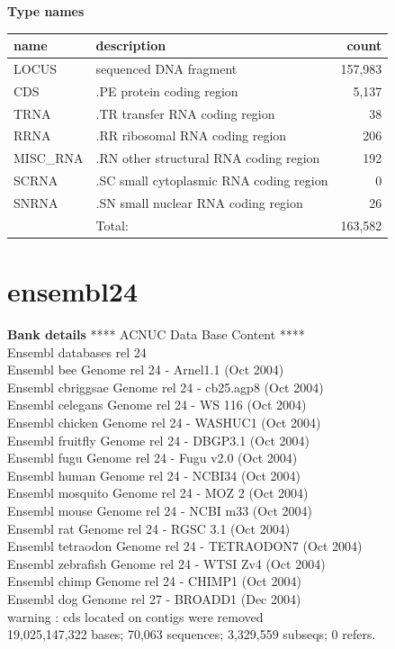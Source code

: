 \documentclass{article}
\begin{document}
\begin{Schunk}
\textbf{Type names}
\noindent\begin{tabular}{llr}
\hline \hline
name & description & count \\
\hline
LOCUS  &  sequenced DNA fragment  &  157,983 \\
CDS  &  .PE protein coding region  &  5,137 \\
TRNA  &  .TR transfer RNA coding region  &  38 \\
RRNA  &  .RR ribosomal RNA coding region  &  206 \\
MISC\_RNA  &  .RN other structural RNA coding region  &  192 \\
SCRNA  &  .SC small cytoplasmic RNA coding region  &  0 \\
SNRNA  &  .SN small nuclear RNA coding region  &  26 \\
\hline
 & Total: & 163,582 \\
\hline \hline
\end{tabular}

\section{ ensembl24 }
\textbf{Bank details}
            ****     ACNUC Data Base Content      ****  \\
	     Ensembl databases rel 24\\
             Ensembl bee  Genome rel 24 - Arnel1.1 (Oct 2004)\\
             Ensembl cbriggsae  Genome rel 24 - cb25.agp8 (Oct 2004)\\
             Ensembl celegans  Genome rel 24 - WS 116 (Oct 2004)\\
             Ensembl chicken  Genome rel 24 - WASHUC1 (Oct 2004)\\
             Ensembl fruitfly  Genome rel 24 - DBGP3.1 (Oct 2004)\\
             Ensembl fugu  Genome rel 24 - Fugu v2.0 (Oct 2004)\\
             Ensembl human  Genome rel 24 - NCBI34 (Oct 2004)\\
             Ensembl mosquito  Genome rel 24 - MOZ 2 (Oct 2004)\\
             Ensembl mouse  Genome rel 24 - NCBI m33 (Oct 2004)\\
             Ensembl rat  Genome rel 24 - RGSC 3.1 (Oct 2004)\\
             Ensembl tetraodon  Genome rel 24 - TETRAODON7 (Oct 2004)\\
             Ensembl zebrafish  Genome rel 24 - WTSI Zv4 (Oct 2004)\\
             Ensembl chimp  Genome rel 24 - CHIMP1 (Oct 2004)\\
	     Ensembl dog  Genome rel 27 - BROADD1 (Dec 2004)\\
   warning : cds located on contigs were removed\\
19,025,147,322 bases; 70,063 sequences; 3,329,559 subseqs; 0 refers.


\end{Schunk}
\end{document}
